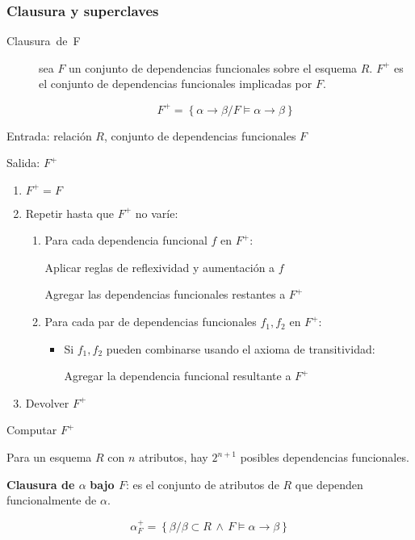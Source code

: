 \documentclass[a4paper, twoside]{article}
\begin{document}
\subsubsection{Clausura y superclaves}
\begin{description}
\item [{Clausura~de~F}] sea $F$ un conjunto de dependencias funcionales
sobre el esquema $R$. $F^{+}$ es el conjunto de dependencias funcionales
implicadas por $F$.


\[
F^{+}=\left\{ \alpha\to\beta/F\vDash\alpha\to\beta\right\} 
\]


\end{description}
\begin{algorithm}[H]
Entrada: relación $R$, conjunto de dependencias funcionales $F$

Salida: $F^{+}$
\begin{enumerate}
\item $F^{+}=F$
\item Repetir hasta que $F^{+}$ no varíe:

\begin{enumerate}
\item Para cada dependencia funcional $f$ en $F^{+}$:


Aplicar reglas de reflexividad y aumentación a $f$


Agregar las dependencias funcionales restantes a $F^{+}$

\item Para cada par de dependencias funcionales $f_{1},f_{2}$ en $F^{+}$:

\begin{itemize}
\item Si $f_{1},f_{2}$ pueden combinarse usando el axioma de transitividad:


Agregar la dependencia funcional resultante a $F^{+}$

\end{itemize}
\end{enumerate}
\item Devolver $F^{+}$
\end{enumerate}
\protect\caption{Computar $F^{+}$}
\end{algorithm}


Para un esquema $R$ con $n$ atributos, hay $2^{n+1}$ posibles dependencias
funcionales.

\textbf{Clausura de $\alpha$} \textbf{bajo $F$}: es el conjunto
de atributos de $R$ que dependen funcionalmente de $\alpha$.

\[
\alpha_{F}^{+}=\left\{ \beta/\beta\subset R\,\wedge\, F\vDash\alpha\to\beta\right\} 
\]
\end{document}
